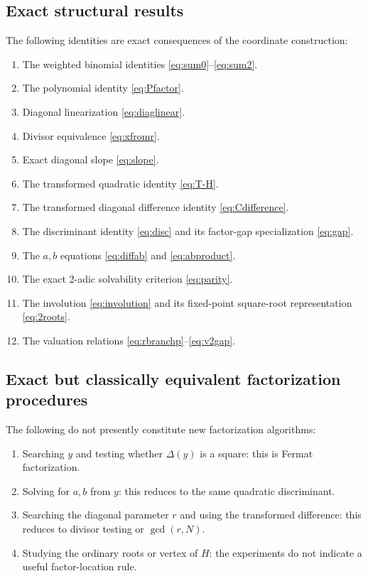 \documentclass[11pt,a4paper]{article}
\begin{document}
\subsection{Exact structural results}
The following identities are exact consequences of the coordinate construction:
\begin{enumerate}[label=\arabic*.]
\item The weighted binomial identities \eqref{eq:sum0}--\eqref{eq:sum2}.
\item The polynomial identity \eqref{eq:Pfactor}.
\item Diagonal linearization \eqref{eq:diaglinear}.
\item Divisor equivalence \eqref{eq:xfromr}.
\item Exact diagonal slope \eqref{eq:slope}.
\item The transformed quadratic identity \eqref{eq:T-H}.
\item The transformed diagonal difference identity \eqref{eq:Cdifference}.
\item The discriminant identity \eqref{eq:disc} and its factor-gap specialization \eqref{eq:gap}.
\item The \(a,b\) equations \eqref{eq:diffab} and \eqref{eq:abproduct}.
\item The exact 2-adic solvability criterion \eqref{eq:parity}.
\item The involution \eqref{eq:involution} and its fixed-point square-root representation \eqref{eq:2roots}.
\item The valuation relations \eqref{eq:rbranchp}--\eqref{eq:v2gap}.
\end{enumerate}

\subsection{Exact but classically equivalent factorization procedures}
The following do not presently constitute new factorization algorithms:
\begin{enumerate}[label=\arabic*.]
\item Searching \(y\) and testing whether \(\Delta(y)\) is a square: this is Fermat factorization.
\item Solving for \(a,b\) from \(y\): this reduces to the same quadratic discriminant.
\item Searching the diagonal parameter \(r\) and using the transformed difference: this reduces to divisor testing or \(\gcd(r,N)\).
\item Studying the ordinary roots or vertex of \(H\): the experiments do not indicate a useful factor-location rule.
\end{enumerate}
\end{document}

